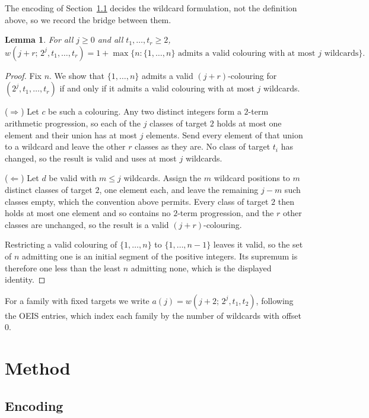 \documentclass[12pt]{article}
\newtheorem{lemma}{Lemma}
\theoremstyle{remark}
\begin{document}
The encoding of Section~\ref{sec:encoding} decides the wildcard formulation,
not the definition above, so we record the bridge between them.

\begin{lemma}\label{lem:wildcards}
For all $j \ge 0$ and all $t_1,\dots,t_r \ge 2$,
\[
  w(j+r;\,2^j,t_1,\dots,t_r) = 1 + \max\bigl\{ n : \{1,\dots,n\}
  \text{ admits a valid colouring with at most } j \text{ wildcards} \bigr\}.
\]
\end{lemma}

\begin{proof}
Fix $n$. We show that $\{1,\dots,n\}$ admits a valid $(j+r)$-colouring for
$(2^j,t_1,\dots,t_r)$ if and only if it admits a valid colouring with at most
$j$ wildcards.

($\Rightarrow$) Let $c$ be such a colouring. Any two distinct integers form a
$2$-term arithmetic progression, so each of the $j$ classes of target $2$
holds at most one element and their union has at most $j$ elements. Send every
element of that union to a wildcard and leave the other $r$ classes as they
are. No class of target $t_i$ has changed, so the result is valid and uses at
most $j$ wildcards.

($\Leftarrow$) Let $d$ be valid with $m \le j$ wildcards. Assign the $m$
wildcard positions to $m$ distinct classes of target $2$, one element each,
and leave the remaining $j-m$ such classes empty, which the convention above
permits. Every class of target $2$ then holds at most one element and so
contains no $2$-term progression, and the $r$ other classes are unchanged, so
the result is a valid $(j+r)$-colouring.

Restricting a valid colouring of $\{1,\dots,n\}$ to $\{1,\dots,n-1\}$ leaves
it valid, so the set of $n$ admitting one is an initial segment of the
positive integers. Its supremum is therefore one less than the least $n$
admitting none, which is the displayed identity.
\end{proof}

For a family with fixed targets we write $a(j) = w(j+2;\,2^j,t_1,t_2)$,
following the OEIS entries, which index each family by the number of
wildcards with offset $0$.

\section{Method}\label{sec:method}

\subsection{Encoding}\label{sec:encoding}
\end{document}

